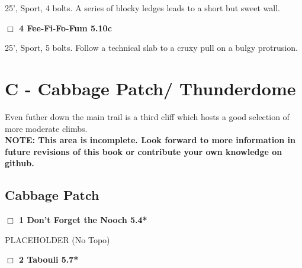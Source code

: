 \begin{multicols}{2}
\begin{adjustwidth}{1.3em}{}
25', Sport, 4 bolts. A series of blocky ledges leads to a short but sweet wall.
\end{adjustwidth}




\needspace{2em}
\label{rt:Fee-Fi-Fo-Fum}
\colorbox{RoyalBlue!20}{
\parbox{0.95\linewidth}{
\hspace{-1ex}\textbf{$\Box$
4 Fee-Fi-Fo-Fum 5.10c  
}}}
\begin{adjustwidth}{1.3em}{}			

25', Sport, 5 bolts. Follow a technical slab to a cruxy pull on a bulgy protrusion.
\end{adjustwidth}





\null\newpage

\section{C - Cabbage Patch/ Thunderdome}\label{sa:Cabbage Patch/ Thunderdome}

Even futher down the main trail is a third cliff which hosts a good selection of more moderate climbs.\\
\textbf{NOTE: This area is incomplete. Look forward to more information in future revisions of this book or contribute your own knowledge on github.}\\




\needspace{10em}
\subsection*{Cabbage Patch}\label{bf:Cabbage Patch}




\needspace{2em}
\label{rt:Don't Forget the Nooch}
\colorbox{green!20}{
\parbox{0.95\linewidth}{
\hspace{-1ex}\textbf{$\Box$
1 Don't Forget the Nooch 5.4*  
}}}
\begin{adjustwidth}{1.3em}{}			

PLACEHOLDER
  (No Topo)
\end{adjustwidth}




\needspace{2em}
\label{rt:Tabouli}
\colorbox{green!20}{
\parbox{0.95\linewidth}{
\hspace{-1ex}\textbf{$\Box$
2 Tabouli 5.7*  
}}}
\begin{adjustwidth}{1.3em}{}			


\end{adjustwidth}
\end{multicols}
